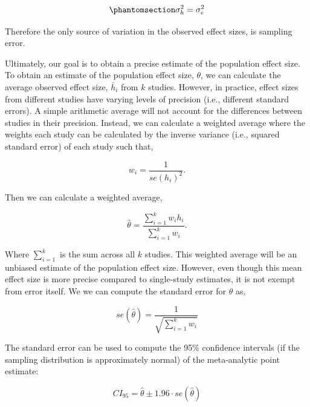\documentclass[
  letterpaper,
  DIV=11,
  numbers=noendperiod]{scrreprt}
\begin{document}
\begin{equation}\phantomsection\label{eq-var-fixed}{
\sigma^2_h = \sigma^2_e
}\end{equation}

Therefore the only source of variation in the observed effect sizes, is
sampling error.

Ultimately, our goal is to obtain a precise estimate of the population
effect size. To obtain an estimate of the population effect size,
\(\theta\), we can calculate the average observed effect size,
\(\bar{h}_i\) from \(k\) studies. However, in practice, effect sizes
from different studies have varying levels of precision (i.e., different
standard errors). A simple arithmetic average will not account for the
differences between studies in their precision. Instead, we can
calculate a weighted average where the weights each study can be
calculated by the inverse variance (i.e., squared standard error) of
each study such that,

\[
w_i = \frac{1}{se(h_i)^2}.
\]

Then we can calculate a weighted average,

\[
\hat{\theta} =\frac{\sum^k_{i=1}w_ih_i}{\sum^k_{i=1}w_i}.
\]

Where \(\sum^k_{i=1}\) is the sum across all \(k\) studies. This
weighted average will be an unbiased estimate of the population effect
size. However, even though this mean effect size is more precise
compared to single-study estimates, it is not exempt from error itself.
We we can compute the standard error for \(\hat{\theta}\) as,

\[
se(\hat{\theta}) = \frac{1}{\sqrt{\sum^k_{i=1} w_i}}
\]

The standard error can be used to compute the 95\% confidence intervals
(if the sampling distribution is approximately normal) of the
meta-analytic point estimate:

\[
CI_{95} = \hat{\theta}\pm 1.96 \cdot se(\hat{\theta})
\]
\end{document}
